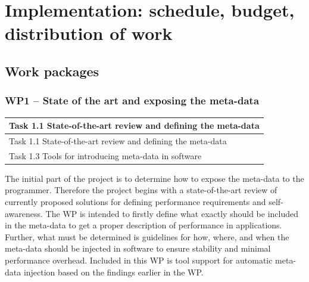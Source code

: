 \documentclass{article}
\begin{document}
\section{Implementation: schedule, budget, distribution of work}
\subsection{Work packages}
\subsubsection{WP1 -- State of the art and exposing the meta-data}
\begin{table}
\vspace{-0.5cm}
\small
\begin{tabular}{ | l |}
\hline
{Task 1.1 State-of-the-art review and defining the meta-data}  \\ \hline
{Task 1.1 State-of-the-art review and defining the meta-data}  \\ \hline
{Task 1.3 Tools for introducing meta-data in software}		\\ \hline
\end{tabular}
\vspace{-0.3cm}
\end{table}
The initial part of the project is to determine how to expose the meta-data to the programmer.
Therefore the project begins with a state-of-the-art review of currently proposed solutions for defining performance requirements and self-awareness.
The WP is intended to firstly define what exactly should be included in the meta-data to get a proper description of performance in applications. 
Further, what must be determined is guidelines for how, where, and when the meta-data should be injected in software to ensure stability and minimal performance overhead.
Included in this WP is tool support for automatic meta-data injection based on the findings earlier in the WP.

\end{document}
